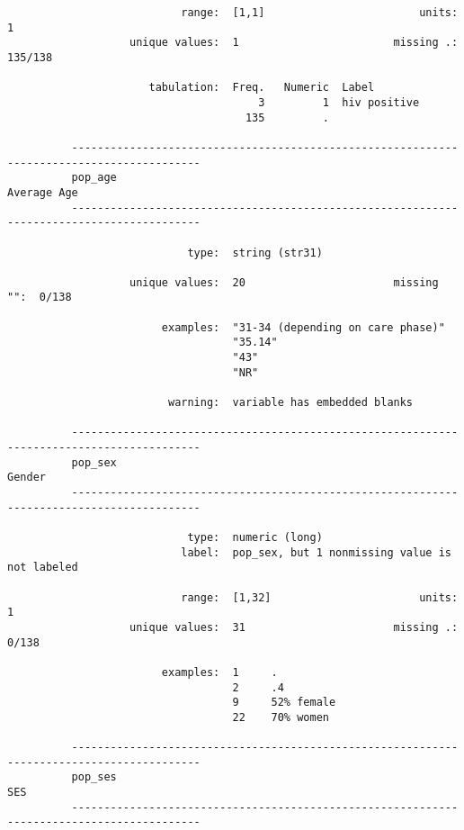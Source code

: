\documentclass{article}
\begin{document}
\begin{verbatim}
                           range:  [1,1]                        units:  1
                   unique values:  1                        missing .:  135/138
          
                      tabulation:  Freq.   Numeric  Label
                                       3         1  hiv positive
                                     135         .  
          
          ------------------------------------------------------------------------------------------
          pop_age                                                                        Average Age
          ------------------------------------------------------------------------------------------
          
                            type:  string (str31)
          
                   unique values:  20                       missing "":  0/138
          
                        examples:  "31-34 (depending on care phase)"
                                   "35.14"
                                   "43"
                                   "NR"
          
                         warning:  variable has embedded blanks
          
          ------------------------------------------------------------------------------------------
          pop_sex                                                                             Gender
          ------------------------------------------------------------------------------------------
          
                            type:  numeric (long)
                           label:  pop_sex, but 1 nonmissing value is not labeled
          
                           range:  [1,32]                       units:  1
                   unique values:  31                       missing .:  0/138
          
                        examples:  1     .
                                   2     .4
                                   9     52% female
                                   22    70% women
          
          ------------------------------------------------------------------------------------------
          pop_ses                                                                                SES
          ------------------------------------------------------------------------------------------
          

\end{verbatim}
\end{document}
